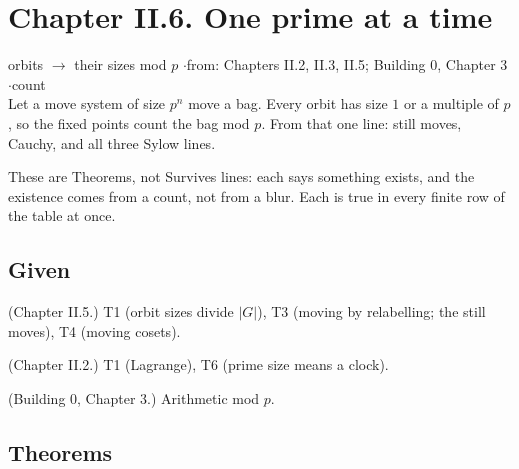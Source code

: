 \newpage

\section*{Chapter II.6. One prime at a time}
\begin{center}
{\normalsize orbits $\to$ their sizes mod $p$ \quad$\cdot$\quad from: Chapters II.2, II.3, II.5; Building 0, Chapter 3 \quad$\cdot$\quad count}\\[4pt]
{\small Let a move system of size $p^n$ move a bag. Every orbit has size $1$ or a multiple of $p$, so the fixed points count the bag mod $p$. From that one line: still moves, Cauchy, and all three Sylow lines.}
\end{center}

These are Theorems, not Survives lines: each says something exists, and the existence comes from a count, not from a blur. Each is true in every finite row of the table at once.

\subsection*{Given}

\begin{lines}
\item[\lab{G1}] (Chapter II.5.) T1 (orbit sizes divide $|G|$), T3 (moving by relabelling; the still moves), T4 (moving cosets).
\item[\lab{G2}] (Chapter II.2.) T1 (Lagrange), T6 (prime size means a clock).
\item[\lab{G3}] (Building 0, Chapter 3.) Arithmetic mod $p$.
\end{lines}

\subsection*{Theorems}

